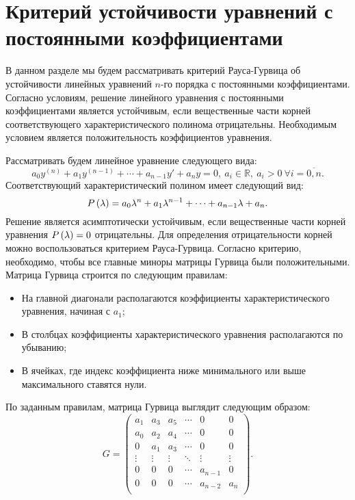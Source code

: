 \section{Критерий устойчивости уравнений с постоянными коэффициентами}

	В данном разделе мы будем рассматривать критерий Рауса-Гурвица об устойчивости линейных уравнений $n$-го порядка с постоянными коэффициентами. Согласно условиям, решение линейного уравнения с постоянными коэффициентами является устойчивым, если вещественные части корней соответствующего характеристического полинома отрицательны. Необходимым условием является положительность коэффициентов уравнения.

	Рассматривать будем линейное уравнение следующего вида:
	\[ a_0 y^{(n)} + a_1 y^{(n-1)} + \cdots + a_{n-1} y' + a_n y = 0, ~ a_i \in \mathbb{R}, ~ a_i > 0 ~ \forall i = \overline{0, n}. \]
	Соответствующий характеристический полином имеет следующий вид:
	\[ P\left( \lambda \right) = a_0 \lambda^n + a_1 \lambda^{n-1} + \cdots + a_{n-1} \lambda + a_n. \]
	Решение является асимптотически устойчивым, если вещественные части корней уравнения $P\left( \lambda \right) = 0$ отрицательны. Для определения отрицательности корней можно воспользоваться критерием Рауса-Гурвица. Согласно критерию, необходимо, чтобы все главные миноры матрицы Гурвица были положительными. Матрица Гурвица строится по следующим правилам:
	\begin{itemize}
		\item На главной диагонали располагаются коэффициенты характеристического уравнения, начиная с $a_1$;
		\item В столбцах коэффициенты характеристического уравнения располагаются по убыванию;
		\item В ячейках, где индекс коэффициента ниже минимального или выше максимального ставятся нули.
	\end{itemize}
	По заданным правилам, матрица Гурвица выглядит следующим образом:
	\[ G = \begin{pmatrix}
		a_1 & a_3 & a_5 & \cdots & 0 & 0 \\
		a_0 & a_2 & a_4 & \cdots & 0 & 0 \\
		0 & a_1 & a_3 & \cdots & 0 & 0 \\
		\vdots & \vdots & \vdots & \ddots & \vdots & \vdots \\
		0 & 0 & 0 & \cdots & a_{n-1} & 0 \\
		0 & 0 & 0 & \cdots & a_{n-2} & a_n \\
	\end{pmatrix}. \]

